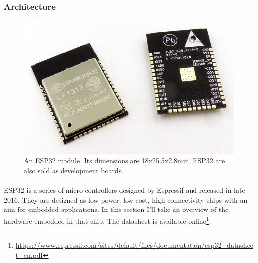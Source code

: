 \documentclass[a4paper]{article}
\begin{document}
\subsubsection{Architecture}
\begin{figure}
	\includegraphics[width=\columnwidth/3]{esp32-wroom-s32-02.jpg}
    \caption{An ESP32 module. Its dimensions are 18x25.5x2.8mm. ESP32 are also sold as development boards.}
\end{figure}
\paragraph{}
ESP32 is a series of micro-controllers designed by Espressif and released in late 2016. They are designed as low-power, low-cost, 
high-connectivity chips with an aim for embedded applications.  In this section I'll take an overview of the hardware embedded in that chip. The datasheet is available online\footnote{\url{https://www.espressif.com/sites/default/files/documentation/esp32_datasheet_en.pdf}}.
\end{document}
